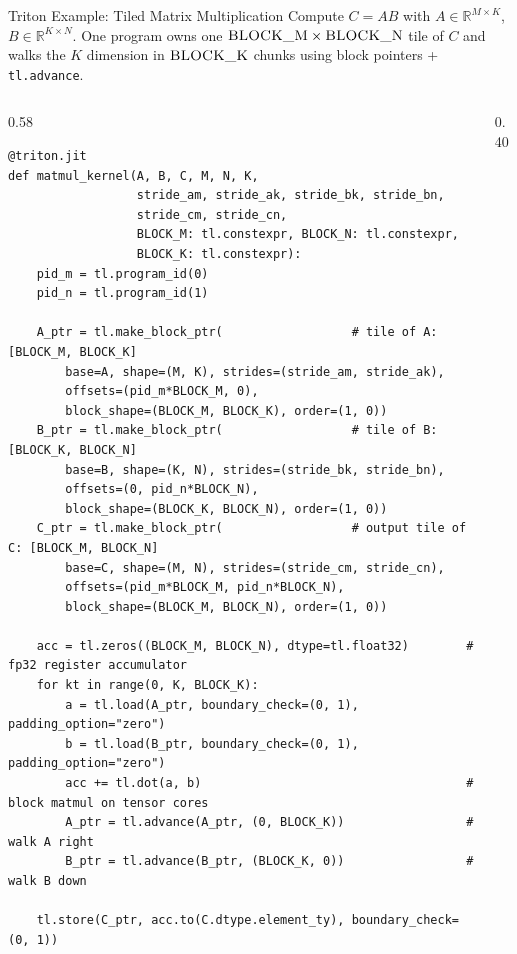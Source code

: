 \begin{frame}[fragile]{Triton Example: Tiled Matrix Multiplication}
  Compute $C = A B$ with $A \in \mathbb{R}^{M\times K}$, $B \in \mathbb{R}^{K\times N}$.
  One program owns one $\textsc{BLOCK\_M}\times\textsc{BLOCK\_N}$ tile of $C$ and
  walks the $K$ dimension in $\textsc{BLOCK\_K}$ chunks using block pointers + \texttt{tl.advance}.

\begin{columns}[T]
  \begin{column}{0.58\textwidth}
\begin{lstlisting}[basicstyle=\ttfamily\scriptsize]
@triton.jit
def matmul_kernel(A, B, C, M, N, K,
                  stride_am, stride_ak, stride_bk, stride_bn,
                  stride_cm, stride_cn,
                  BLOCK_M: tl.constexpr, BLOCK_N: tl.constexpr,
                  BLOCK_K: tl.constexpr):
    pid_m = tl.program_id(0)
    pid_n = tl.program_id(1)

    A_ptr = tl.make_block_ptr(                  # tile of A: [BLOCK_M, BLOCK_K]
        base=A, shape=(M, K), strides=(stride_am, stride_ak),
        offsets=(pid_m*BLOCK_M, 0),
        block_shape=(BLOCK_M, BLOCK_K), order=(1, 0))
    B_ptr = tl.make_block_ptr(                  # tile of B: [BLOCK_K, BLOCK_N]
        base=B, shape=(K, N), strides=(stride_bk, stride_bn),
        offsets=(0, pid_n*BLOCK_N),
        block_shape=(BLOCK_K, BLOCK_N), order=(1, 0))
    C_ptr = tl.make_block_ptr(                  # output tile of C: [BLOCK_M, BLOCK_N]
        base=C, shape=(M, N), strides=(stride_cm, stride_cn),
        offsets=(pid_m*BLOCK_M, pid_n*BLOCK_N),
        block_shape=(BLOCK_M, BLOCK_N), order=(1, 0))

    acc = tl.zeros((BLOCK_M, BLOCK_N), dtype=tl.float32)        # fp32 register accumulator
    for kt in range(0, K, BLOCK_K):
        a = tl.load(A_ptr, boundary_check=(0, 1), padding_option="zero")
        b = tl.load(B_ptr, boundary_check=(0, 1), padding_option="zero")
        acc += tl.dot(a, b)                                     # block matmul on tensor cores
        A_ptr = tl.advance(A_ptr, (0, BLOCK_K))                 # walk A right
        B_ptr = tl.advance(B_ptr, (BLOCK_K, 0))                 # walk B down

    tl.store(C_ptr, acc.to(C.dtype.element_ty), boundary_check=(0, 1))
\end{lstlisting}
  \end{column}
  \begin{column}{0.40\textwidth}
    \centering
\end{column}
\end{columns}
\end{frame}
